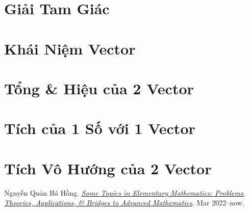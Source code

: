 \documentclass[oneside]{book}
\numberwithin{equation}{section}
\begin{document}
\section{Giải Tam Giác}

\section{Khái Niệm Vector}

\section{Tổng \& Hiệu của 2 Vector}

\section{Tích của 1 Số với 1 Vector}

\section{Tích Vô Hướng của 2 Vector}


\begin{thebibliography}{99}
	 Nguyễn Quản Bá Hồng. \href{https://github.com/NQBH/hobby/blob/master/elementary_mathematics/some_topics_in_elementary_mathematics_problems_theories_applications_bridges_to_advanced_mathematics/NQBH_some_topics_in_elementary_mathematics_problems_theories_applications_bridges_to_advanced_mathematics.pdf}{\textit{Some Topics in Elementary Mathematics: Problems, Theories, Applications, \& Bridges to Advanced Mathematics}}. Mar 2022--now.
\end{thebibliography}


\printbibliography[heading=bibintoc]
\end{document}
